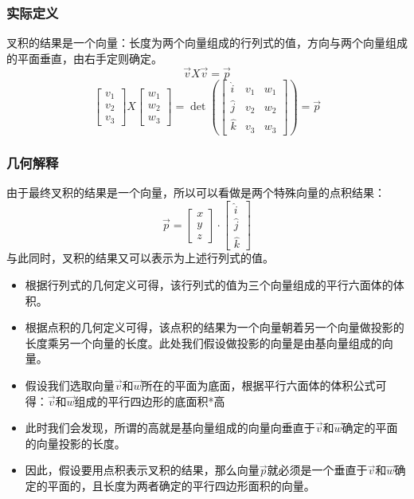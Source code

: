 \documentclass[UTF8]{ctexart}
\begin{document}
\subsubsection{实际定义}
叉积的结果是一个向量：长度为两个向量组成的行列式的值，方向与两个向量组成的平面垂直，由右手定则确定。
$$\overrightarrow{v} X \overrightarrow{v} = \overrightarrow{p}$$
$$\begin{bmatrix}
	v_1 \\ v_2 \\ v_3
\end{bmatrix} X \begin{bmatrix}
	w_1 \\ w_2 \\ w_3
\end{bmatrix} = \det( \begin{bmatrix}
	\hat{i} & v_1 & w_1 \\ \hat{j} & v_2 & w_2 \\ \hat{k} & v_3 & w_3
\end{bmatrix}) = \overrightarrow{p}$$
\subsubsection{几何解释}
由于最终叉积的结果是一个向量，所以可以看做是两个特殊向量的点积结果：
$$\overrightarrow{p} = \begin{bmatrix}
	x \\ y \\ z 
\end{bmatrix} \cdot \begin{bmatrix}
	\hat{i} \\ \hat{j} \\ \hat{k} 
\end{bmatrix}$$
与此同时，叉积的结果又可以表示为上述行列式的值。
\begin{itemize}
	\item 根据行列式的几何定义可得，该行列式的值为三个向量组成的平行六面体的体积。
	\item 根据点积的几何定义可得，该点积的结果为一个向量朝着另一个向量做投影的长度乘另一个向量的长度。此处我们假设做投影的向量是由基向量组成的向量。
	\item 假设我们选取向量$\overrightarrow{v}$和$\overrightarrow{w}$所在的平面为底面，根据平行六面体的体积公式可得：$\overrightarrow{v}$和$\overrightarrow{w}$组成的平行四边形的底面积*高
	\item 此时我们会发现，所谓的高就是基向量组成的向量向垂直于$\overrightarrow{v}$和$\overrightarrow{w}$确定的平面的向量投影的长度。
	\item 因此，假设要用点积表示叉积的结果，那么向量$\overrightarrow{p}$就必须是一个垂直于$\overrightarrow{v}$和$\overrightarrow{w}$确定的平面的，且长度为两者确定的平行四边形面积的向量。
\end{itemize}
\end{document}
